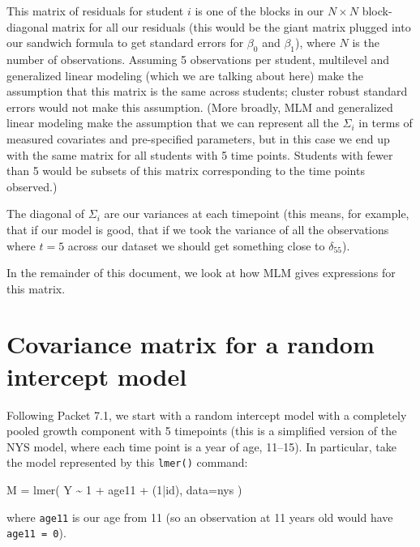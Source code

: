 \documentclass[
  letterpaper,
  DIV=11,
  numbers=noendperiod]{scrreprt}
\newenvironment{Shaded}{}{}
\newcommand{\AttributeTok}[1]{\textcolor[rgb]{0.49,0.56,0.16}{#1}}
\newcommand{\DecValTok}[1]{\textcolor[rgb]{0.25,0.63,0.44}{#1}}
\newcommand{\FunctionTok}[1]{\textcolor[rgb]{0.02,0.16,0.49}{#1}}
\newcommand{\NormalTok}[1]{#1}
\newcommand{\OtherTok}[1]{\textcolor[rgb]{0.00,0.44,0.13}{#1}}
\newcommand{\SpecialCharTok}[1]{\textcolor[rgb]{0.25,0.44,0.63}{#1}}
\begin{document}
This matrix of residuals for student \(i\) is one of the blocks in our
\(N \times N\) block-diagonal matrix for all our residuals (this would
be the giant matrix plugged into our sandwich formula to get standard
errors for \(\beta_0\) and \(\beta_1\)), where \(N\) is the number of
observations. Assuming 5 observations per student, multilevel and
generalized linear modeling (which we are talking about here) make the
assumption that this matrix is the same across students; cluster robust
standard errors would not make this assumption. (More broadly, MLM and
generalized linear modeling make the assumption that we can represent
all the \(\Sigma_i\) in terms of measured covariates and pre-specified
parameters, but in this case we end up with the same matrix for all
students with 5 time points. Students with fewer than 5 would be subsets
of this matrix corresponding to the time points observed.)

The diagonal of \(\Sigma_i\) are our variances at each timepoint (this
means, for example, that if our model is good, that if we took the
variance of all the observations where \(t=5\) across our dataset we
should get something close to \(\delta_{55}\)).

In the remainder of this document, we look at how MLM gives expressions
for this matrix.

\section{Covariance matrix for a random intercept
model}\label{covariance-matrix-for-a-random-intercept-model}

Following Packet 7.1, we start with a random intercept model with a
completely pooled growth component with 5 timepoints (this is a
simplified version of the NYS model, where each time point is a year of
age, 11--15). In particular, take the model represented by this
\texttt{lmer()} command:

\begin{Shaded}
\begin{Highlighting}[]
\NormalTok{M }\OtherTok{=} \FunctionTok{lmer}\NormalTok{( Y }\SpecialCharTok{\textasciitilde{}} \DecValTok{1} \SpecialCharTok{+}\NormalTok{ age11 }\SpecialCharTok{+}\NormalTok{ (}\DecValTok{1}\SpecialCharTok{|}\NormalTok{id), }\AttributeTok{data=}\NormalTok{nys )}
\end{Highlighting}
\end{Shaded}

where \texttt{age11} is our age from 11 (so an observation at 11 years
old would have \texttt{age11\ =\ 0}).
\end{document}

